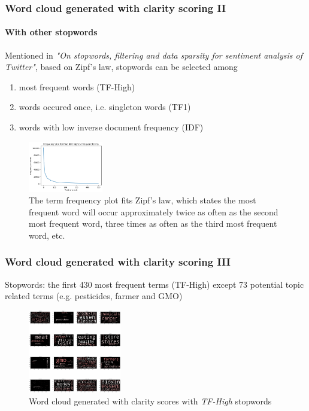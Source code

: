 \documentclass{tum-presentation}
\begin{document}
\begin{frame}
  \frametitle{Word cloud generated with clarity scoring II}
  \framesubtitle{With other stopwords}
  Mentioned in \cite{stopwords} \emph{"On stopwords, filtering and data sparsity for sentiment analysis of Twitter"}, based on Zipf's law, stopwords can be selected among
  \begin{enumerate}
  \item most frequent words (TF-High)
  \item words occured once, i.e. singleton words (TF1)
  \item words with low inverse document frequency (IDF)
  \end{enumerate}
  \begin{center}
    \begin{figure}[t]
      \includegraphics[width=0.29\textwidth]{images/tf-plot.png}
      \caption{The term frequency plot fits Zipf's law, which states the most frequent word will occur approximately twice as often as the second most frequent word, three times as often as the third most frequent word, etc.}
    \end{figure}
  \end{center}
\end{frame}

\begin{frame}
  \frametitle{Word cloud generated with clarity scoring III}
  Stopwords: the first 430 most frequent terms (TF-High) except 73 potential topic related terms (e.g. pesticides, farmer and GMO)
  \begin{center}
    \begin{figure}[t]
      \includegraphics[width=0.36\textwidth]{images/tfhigh_wordcloud.png}
      \caption{Word cloud generated with clarity scores with \emph{TF-High} stopwords}
    \end{figure}
  \end{center}
\end{frame}
\end{document}
